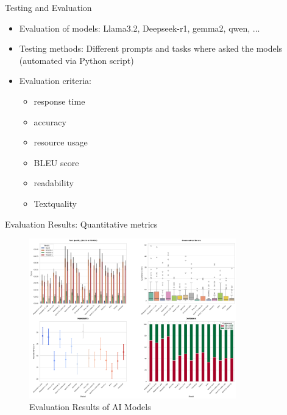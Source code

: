 \documentclass{beamer}
\begin{document}
\begin{frame}{Testing and Evaluation}
  \begin{itemize}
    \item Evaluation of models: Llama3.2, Deepseek-r1, gemma2, qwen, ...
    \item Testing methods: Different prompts and tasks where asked the models (automated via Python script)
    \item Evaluation criteria: 
      \begin{itemize}
        \item response time
        \item accuracy
        \item resource usage
        \item BLEU score
        \item readability
        \item Textquality
      \end{itemize}
  \end{itemize}
\end{frame}

\begin{frame}{Evaluation Results: Quantitative metrics}
  \begin{figure}
    \centering
    \includegraphics[width=0.8\textwidth]{combined_metrics.png}
    \caption{Evaluation Results of AI Models}
    \label{fig:evaluation-results}
  \end{figure}
\end{frame}
\end{document}
